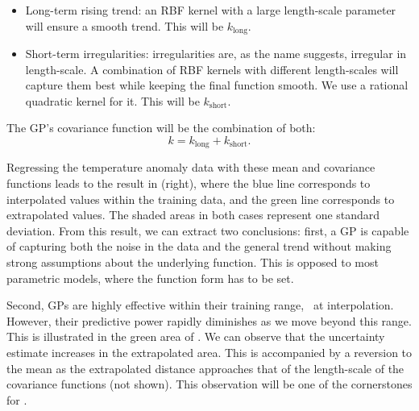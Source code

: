 \begin{itemize}
    \item Long-term rising trend: an RBF kernel with a large length-scale parameter will ensure a smooth trend. This will be $k_\text{long}$.
    \item Short-term irregularities: irregularities are, as the name suggests, irregular in length-scale. A combination of RBF kernels with different length-scales will capture them best while keeping the final function smooth. We use a rational quadratic kernel for it. This will be $k_\text{short}$.
\end{itemize}

The GP's covariance function will be the combination of both:
\begin{equation*}
    k = k_\text{long} + k_\text{short}.
\end{equation*}

Regressing the temperature anomaly data with these mean and covariance functions leads to the result in  (right), where the blue line corresponds to interpolated values within the training data, and the green line corresponds to extrapolated values. The shaded areas in both cases represent one standard deviation. From this result, we can extract two conclusions: first, a GP is capable of capturing both the noise in the data and the general trend without making strong assumptions about the underlying function. This is opposed to most parametric models, where the function form has to be set.

Second, GPs are highly effective within their training range, \ie~at interpolation. However, their predictive power rapidly diminishes as we move beyond this range. This is illustrated in the green area of . We can observe that the uncertainty estimate increases in the extrapolated area. This is accompanied by a reversion to the mean as the extrapolated distance approaches that of the length-scale of the covariance functions (not shown). This observation will be one of the cornerstones for .
